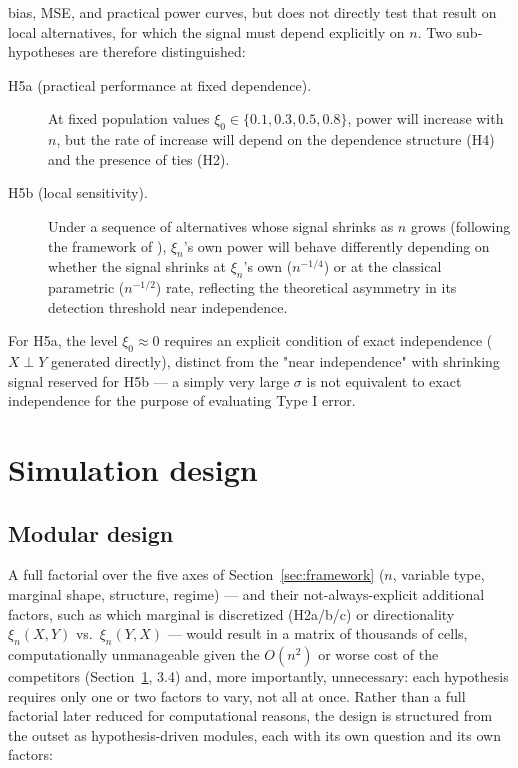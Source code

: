 \documentclass[article]{ajs}
\begin{document}
\begin{description}
  bias, MSE, and practical power curves, but does not directly test
  that result on local alternatives, for which the signal must depend
  explicitly on $n$. Two sub-hypotheses are therefore distinguished:
  \begin{description}
  \item[H5a (practical performance at fixed dependence).] At fixed
    population values $\xi_0 \in \{0.1,0.3,0.5,0.8\}$, power will
    increase with $n$, but the rate of increase will depend on the
    dependence structure (H4) and the presence of ties (H2).
  \item[H5b (local sensitivity).] Under a sequence of alternatives
    whose signal shrinks as $n$ grows (following the framework of
    \citealp{auddy2024}), $\xi_n$'s own power will behave differently
    depending on whether the signal shrinks at $\xi_n$'s own
    ($n^{-1/4}$) or at the classical parametric ($n^{-1/2}$) rate,
    reflecting the theoretical asymmetry in its detection threshold
    near independence.
  \end{description}
  For H5a, the level $\xi_0 \approx 0$ requires an explicit condition
  of exact independence ($X \perp Y$ generated directly), distinct
  from the "near independence" with shrinking signal reserved for
  H5b --- a simply very large $\sigma$ is not equivalent to exact
  independence for the purpose of evaluating Type I error.
\end{description}

\section{Simulation design} \label{sec:design}

\subsection{Modular design}

A full factorial over the five axes of Section~\ref{sec:framework}
($n$, variable type, marginal shape, structure, regime) --- and their
not-always-explicit additional factors, such as which marginal is
discretized (H2a/b/c) or directionality $\xi_n(X,Y)$ vs.\
$\xi_n(Y,X)$ --- would result in a matrix of thousands of cells,
computationally unmanageable given the $O(n^2)$ or worse cost of the
competitors (Section~\ref{sec:design}, 3.4) and, more importantly,
unnecessary: each hypothesis requires only one or two factors to vary,
not all at once. Rather than a full factorial later reduced for
computational reasons, the design is structured from the outset as
hypothesis-driven modules, each with its own question and its own
factors:
\end{document}
